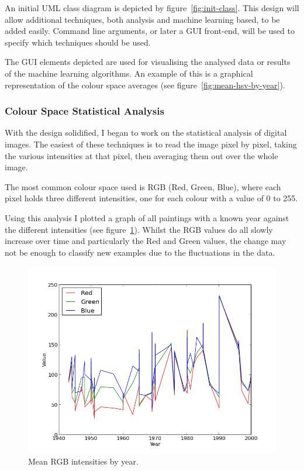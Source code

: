 \documentclass[11pt,fleqn,twoside]{article}
\begin{document}
An initial UML class diagram is depicted by figure~\ref{fig:init-class}. This design will allow 
additional techniques, both analysis and machine learning based, to be added easily. Command line
arguments, or later a GUI front-end, will be used to specify which techniques should be used.

The GUI elements depicted are used for visualising the analysed data or results of the machine
learning algorithms. An example of this is a graphical representation of the colour space averages
(see figure~\ref{fig:mean-hsv-by-year}).

\subsubsection{Colour Space Statistical Analysis}
With the design solidified, I began to work on the statistical analysis of digital images. The 
easiest of these techniques is to read the image pixel by pixel, taking the various intensities at
that pixel, then averaging them out over the whole image.

The most common colour space used is RGB (Red, Green, Blue), where each pixel holds three different
intensities, one for each colour with a value of 0 to 255.

Using this analysis I plotted a graph of all paintings with a known year against the different 
intensities (see figure~\ref{fig:mean-rgb-by-year}). Whilst the RGB values do all slowly increase
over time and particularly the Red and Green values, the change may not be enough to classify new
examples due to the fluctuations in the data. 

\begin{figure}[p]
\centering
\includegraphics[scale=0.5]{img/kyffin-rgp-avg.png}
\caption{Mean RGB intensities by year.}
\label{fig:mean-rgb-by-year}
\end{figure}
\end{document}
